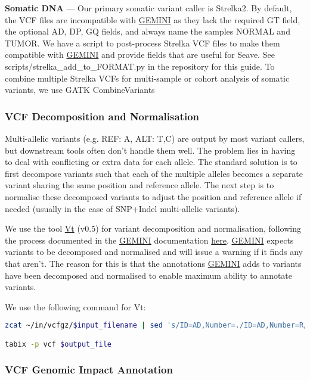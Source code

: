 \documentclass[11pt, a4paper]{article}
\newcommand{\GEMINI}{\href{https://gemini.readthedocs.io}{GEMINI} } %
\begin{document}
\textbf{Somatic DNA} --- Our primary somatic variant caller is Strelka2. By default, the VCF files are incompatible with \GEMINI as they lack the required GT field, the optional AD, DP, GQ fields, and always name the samples NORMAL and TUMOR. We have a script to post-process Strelka VCF files to make them compatible with \GEMINI and provide fields that are useful for Seave. See scripts/strelka\_add\_to\_FORMAT.py in the repository for this guide. To combine multiple Strelka VCFs for multi-sample or cohort analysis of somatic variants, we use GATK CombineVariants

\subsubsection{VCF Decomposition and Normalisation}

Multi-allelic variants (e.g. REF: A, ALT: T,C) are output by most variant callers, but downstream tools often don't handle them well. The problem lies in having to deal with conflicting or extra data for each allele. The standard solution is to first decompose variants such that each of the multiple alleles becomes a separate variant sharing the same position and reference allele. The next step is to normalise these decomposed variants to adjust the position and reference allele if needed (usually in the case of SNP+Indel multi-allelic variants).

We use the tool \href{https://genome.sph.umich.edu/wiki/Vt}{Vt} (v0.5) for variant decomposition and normalisation, following the process documented in the \GEMINI documentation \href{https://gemini.readthedocs.io/en/latest/#new-gemini-workflow}{here}. \GEMINI expects variants to be decomposed and normalised and will issue a warning if it finds any that aren't. The reason for this is that the annotations \GEMINI adds to variants have been decomposed and normalised to enable maximum ability to annotate variants.

We use the following command for Vt:

\begin{lstlisting}[language=bash]
zcat ~/in/vcfgz/$input_filename | sed 's/ID=AD,Number=./ID=AD,Number=R/'  | vt decompose -s - | vt normalize -r genome.fa - | vt sort -o $output_file -

tabix -p vcf $output_file
\end{lstlisting}

\subsubsection{VCF Genomic Impact Annotation}
\end{document}
